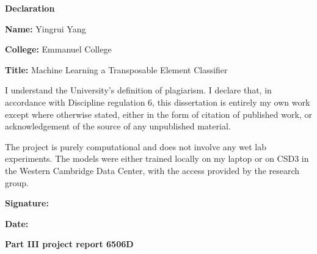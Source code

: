 \documentclass[12pt]{article}
\begin{document}
\newpage
\thispagestyle{empty}

\vspace*{1cm}

\begin{center}
    {\Large\bfseries Declaration\par}
\end{center}

\vspace{1cm}

\noindent\textbf{Name:} Yingrui Yang

\vspace{0.5cm}

\noindent\textbf{College:} Emmanuel College

\vspace{0.5cm}

\noindent\textbf{Title:} Machine Learning a Transposable Element Classifier

\vspace{1.5cm}

\noindent I understand the University's definition of plagiarism. I declare that, in accordance with Discipline regulation 6, this dissertation is entirely my own work except where otherwise stated, either in the form of citation of published work, or acknowledgement of the source of any unpublished material.

\vspace{1.5cm}

\noindent The project is purely computational and does not involve any wet lab experiments. The models were either trained locally on my laptop or on CSD3 in the Western Cambridge Data Center, with the access provided by the research group. 

\vspace{2cm}

\noindent\textbf{Signature:} \hrulefill

\vspace{1cm}

\noindent\textbf{Date:} \hrulefill

\newpage
\thispagestyle{empty}

\vspace*{\fill}
\begin{center}
    {\fontsize{24.88}{34}\selectfont\bfseries Part III project report 6506D\par}
\end{center}
\vspace*{\fill}
\end{document}
